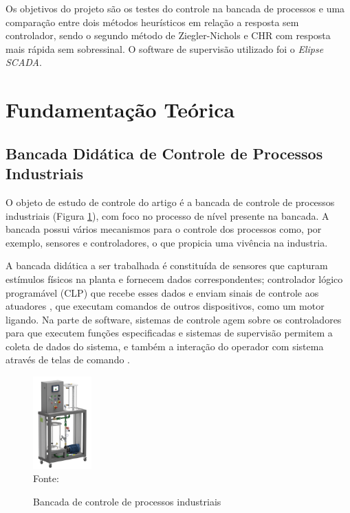 \documentclass[12 pt,conference]{IEEEtran}
\begin{document}
        Os objetivos do projeto são os testes do controle na bancada de processos e uma comparação entre dois métodos heurísticos em relação a resposta sem controlador, sendo o segundo método de Ziegler-Nichols e CHR com resposta mais rápida sem sobressinal. O software de supervisão utilizado foi o \textit{Elipse SCADA}.

    \section{Fundamentação Teórica}
    
    \subsection{Bancada Didática de Controle de Processos Industriais}
    
    O objeto de estudo de controle do artigo é a bancada de controle de processos industriais (Figura \ref{figura:bancada}), com foco no processo de nível presente na bancada. A bancada possui vários mecanismos  para o controle dos processos como, por exemplo, sensores e controladores, o que propicia uma vivência na industria.
    
    A bancada didática a ser trabalhada é constituída de sensores que capturam estímulos físicos na planta e fornecem dados correspondentes;  controlador lógico programável (CLP) que recebe esses dados e enviam sinais de controle aos atuadores , que executam comandos de outros dispositivos, como um motor ligando. Na parte de software, sistemas de controle agem sobre os controladores para que executem funções especificadas e sistemas de supervisão permitem a coleta de dados do sistema, e também a interação do operador com sistema através de telas de comando \cite{auttom}.
    
    \begin{figure}[!http]
       \centering
        \caption{Bancada de controle de processos industriais}
        \includegraphics[width=0.2\textwidth]{imagens/Bancada.png}\\
        Fonte: \cite{auttom}
        \label{figura:bancada}
    \end{figure}
   
\end{document}
